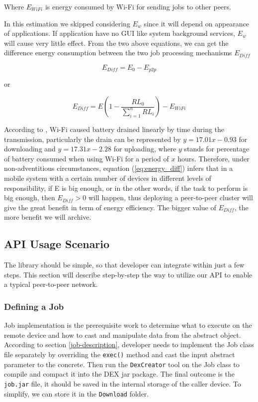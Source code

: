 \documentclass[conference]{IEEEtran}
\begin{document}
Where $E_{WiFi}$ is energy consumed by Wi-Fi for sending jobs to other peers.

In this estimation we skipped considering $E_{w}$ since it will depend on appearance of applications. If application have no GUI like system background services, $E_{w}$ will cause very little effect. From the two above equations, we can get the difference energy consumption between the two job processing mechanisms $E_{Diff}$ 

$$E_{Diff} = E_{0} - E_{p2p}$$ 

or 

\begin{equation}
\label{eq:energy_diff}
E_{Diff} = E(1 - \frac{RL_{0}}{\sum_{i=1}^{n}{RL_{i}}}) - E_{WiFi}
\end{equation}

According to \cite{wifi_energy}, Wi-Fi caused battery drained linearly by time during the transmission, particularly the drain can be represented by $y = 17.01x - 0.93$ for downloading and $y = 17.31x - 2.28$ for uploading, where $y$ stands for percentage of battery consumed when using Wi-Fi for a period of $x$ hours. Therefore, under non-adventitious circumstances, equation (\ref{eq:energy_diff}) infers that in a mobile system with a certain number of devices in different levels of responsibility, if E is big enough, or in the other words, if the task to perform is big enough, then $E_{Diff} > 0$ will happen, thus deploying a peer-to-peer cluster will give the great benefit in term of energy efficiency. The bigger value of $E_{Diff}$, the more benefit we will archive.

\subsection{API Usage Scenario}

The library should be simple, so that developer can integrate within just a few steps. This section will describe step-by-step the way to utilize our API to enable a typical peer-to-peer network.

\subsubsection{Defining a Job}

Job implementation is the prerequisite work to determine what to execute on the remote device and how to cast and manipulate data from the abstract object. According to section \ref{job-description}, developer needs to implement the Job class file separately by overriding the \texttt{exec()} method and cast the input abstract parameter to the concrete. Then run the \texttt{DexCreator} tool on the Job class to compile and compact it into the DEX jar package. The final outcome is the \texttt{job.jar} file, it should be saved in the internal storage of the caller device. To simplify, we can store it in the \texttt{Download} folder.  
\end{document}
